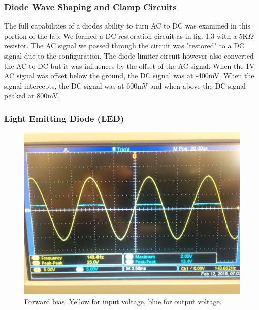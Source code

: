 \documentclass[11pt,letterpaper,onecolumn]{article}
\begin{document}
\subsubsection{Diode Wave Shaping and Clamp Circuits}

The full capabilities of a diodes ability to turn AC to DC was examined in this portion of the lab. We formed a DC restoration circuit as in fig. 1.3 with a 5K$\Omega$ resistor. The AC signal we passed through the circuit was "restored" to a DC signal due to the configuration. The diode limiter circuit however also converted the AC to DC but it was influences by the offset of the AC signal. When the 1V AC signal was offset below the ground, the DC signal was at -400mV. When the signal intercepts, the DC signal was at 600mV and when above the DC signal peaked at 800mV.   

\subsubsection{Light Emitting Diode (LED)}

\begin{figure}[H]
    \centering
    \includegraphics[scale =.1]{Forwardbias.jpg}
    \caption{Forward bias. Yellow for input voltage, blue for output voltage.}
    \label{fig:frwdb}
\end{figure}
\end{document}
